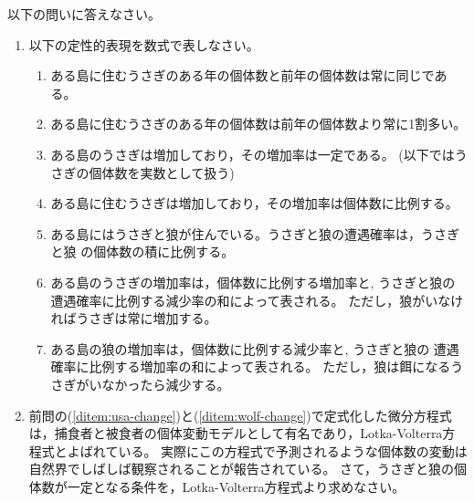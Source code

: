 \documentclass[twocolumn,11pt]{jarticle}
\begin{document}
\nquestion 以下の問いに答えなさい。
\begin{enumerate}
\item 以下の定性的表現を数式で表しなさい。
\begin{enumerate}
	\item\label{ditem:usa-C} ある島に住むうさぎのある年の個体数と前年の個体数は常に同じである。
	\item\label{ditem:usa+10} ある島に住むうさぎのある年の個体数は前年の個体数より常に1割多い。
	\item\label{ditem:usa-cresc}
	ある島のうさぎは増加しており，その増加率は一定である。
  (以下ではうさぎの個体数を実数として扱う)
	\item\label{ditem:usa-moltocresc}
  ある島に住むうさぎは増加しており，その増加率は個体数に比例する。
	\item\label{ditem:Pusa-okami}
  ある島にはうさぎと狼が住んでいる。うさぎと狼の遭遇確率は，うさぎと狼
  の個体数の積に比例する。
	\item\label{ditem:usa-change}
  ある島のうさぎの増加率は，個体数に比例する増加率と, うさぎと狼の
  遭遇確率に比例する減少率の和によって表される。
  ただし，狼がいなければうさぎは常に増加する。
	\item\label{ditem:wolf-change}
  ある島の狼の増加率は，個体数に比例する減少率と, うさぎと狼の
  遭遇確率に比例する増加率の和によって表される。
  ただし，狼は餌になるうさぎがいなかったら減少する。
\end{enumerate}
\item 前問の(\ref{ditem:usa-change})と(\ref{ditem:wolf-change})で定式化した微分方程式は，捕食者と被食者の個体変動モデルとして有名であり，Lotka-Volterra方程式とよばれている。
  実際にこの方程式で予測されるような個体数の変動は自然界でしばしば観察されることが報告されている。
  さて，うさぎと狼の個体数が一定となる条件を，Lotka-Volterra方程式より求めなさい。
\end{enumerate}
\end{document}
